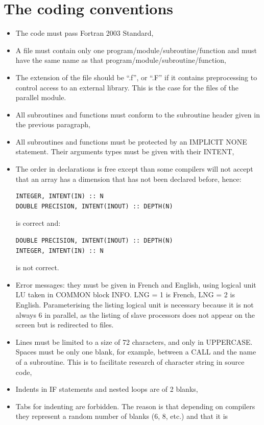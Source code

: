 \section{The coding conventions}

\begin{itemize}
\item The code must pass Fortran 2003 Standard,
\item A file must contain only one program/module/subroutine/function and must
have the same name as that program/module/subroutine/function,
\item The extension of the file should be ``.f'', or ``.F'' if it contains
  preprocessing to control access to an external library. This is the case for
  the files of the parallel module.
\item All subroutines and functions must conform to the subroutine header given
in the previous paragraph,
\item All subroutines and functions must be protected by an IMPLICIT NONE
statement. Their arguments types must be given with their INTENT,
\item The order in declarations is free except than some compilers will not
accept that an array has a dimension that has not been declared before, hence:
\begin{lstlisting}
INTEGER, INTENT(IN) :: N
DOUBLE PRECISION, INTENT(INOUT) :: DEPTH(N)
\end{lstlisting}
is correct and:
\begin{lstlisting}
DOUBLE PRECISION, INTENT(INOUT) :: DEPTH(N)
INTEGER, INTENT(IN) :: N
\end{lstlisting}
is not correct.
\item Error messages: they must be given in French and English, using logical
unit LU taken in COMMON block INFO. LNG = 1 is French, LNG = 2 is English.
Parameterising the listing logical unit is necessary because it is not always 6
in parallel, as the listing of slave processors does not appear on the screen
but is redirected to files.
\item Lines must be limited to a size of 72 characters, and only in UPPERCASE.
Spaces must be only one blank, for example, between a CALL and the name of a
subroutine. This is to facilitate research of character string in source code,
\item Indents in IF statements and nested loops are of 2 blanks,
\item Tabs for indenting are forbidden. The reason is that depending on
compilers they represent a random number of blanks (6, 8, etc.) and that it is

\end{itemize}
